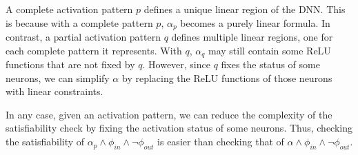\documentclass[oneside,11pt,dvipsnames]{book}
\numberwithin{equation}{section}
\theoremstyle{definition}
\theoremstyle{remark}
\begin{document}
A complete activation pattern $p$ defines a unique linear region of the DNN. This is because with a complete pattern $p$, $\alpha_p$ becomes a purely linear formula.
In contrast, a partial activation pattern $q$ defines multiple linear regions, one for each complete pattern it represents.  With $q$, $\alpha_q$ may still contain some ReLU functions that are not fixed by $q$.  However, since $q$ fixes the status of some neurons, we can simplify $\alpha$ by replacing the ReLU functions of those neurons with linear constraints.

In any case, given an activation pattern, we can reduce the complexity of the satisfiability check by fixing the activation status of some neurons. Thus, checking the satisfiability of $\alpha_p \land \phi_{in} \land \neg \phi_{out}$ is easier than checking that of $\alpha \land \phi_{in} \land \neg \phi_{out}$.
\end{document}
